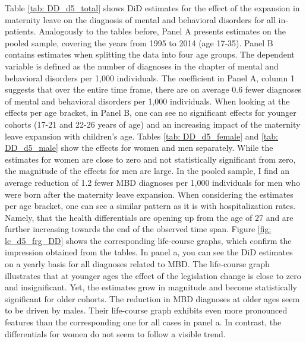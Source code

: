 \documentclass[11pt, a4paper,draft]{article} %
\begin{document}
Table \ref{tab: DD_d5_total} shows DiD estimates for the effect of the expansion in maternity leave on the diagnosis of mental and behavioral disorders for all in-patients. Analogously to the tables before, Panel A presents estimates on the pooled sample, covering the years from 1995 to 2014 (age 17-35). Panel B contains estimates when splitting the data into four age groups. The dependent variable is defined as the number of diagnoses in the chapter of mental and behavioral disorders per 1,000 individuals. The coefficient in Panel A, column 1 suggests that over the entire time frame, there are on average 0.6 fewer diagnoses of mental and behavioral disorders per 1,000 individuals. When looking at the effects per age bracket, in Panel B, one can see no significant effects for younger cohorts (17-21 and 22-26 years of age) and an increasing impact of the maternity leave expansion with children's age. Tables \ref{tab: DD_d5_female} and \ref{tab: DD_d5_male} show the effects for women and men separately. While the estimates for women are close to zero and not statistically significant from zero, the magnitude of the effects for men are large. In the pooled sample, I find an average reduction of 1.2 fewer MBD diagnoses per 1,000 individuals for men who were born after the maternity leave expansion. When considering the estimates per age bracket, one can see a similar pattern as it is with hospitalization rates. Namely, that the health differentials are opening up from the age of 27 and are further increasing towards the end of the observed time span. Figure \ref{fig: lc_d5_frg_DD} shows the corresponding life-course graphs, which confirm the impression obtained from the tables. In panel a, you can see the DiD estimates on a yearly basis for all diagnoses related to MBD. The life-course graph illustrates that at younger ages the effect of the legislation change is close to zero and insignificant. Yet, the estimates grow in magnitude and become statistically significant for older cohorts. The reduction in MBD diagnoses at older ages seem to be driven by males. Their life-course graph exhibits even more pronounced features than the corresponding one for all cases in panel a. In contrast, the differentials for women do not seem to follow a visible trend. \newline
\end{document}
